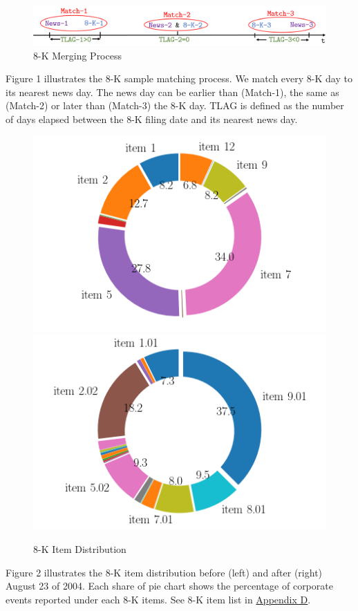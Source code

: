 \begin{figure}
	\caption{8-K Merging Process} \label{fig1}
	\begin{center}
		\includegraphics[scale=0.7]{../output/fig/fig1_matching.png}
	\end{center}
\end{figure}

Figure 1 illustrates the 8-K sample matching process. We match every 8-K day to its nearest news day. The news day can be earlier than (Match-1), the same as (Match-2) or later than (Match-3) the 8-K day. TLAG is defined as the number of days elapsed between the 8-K filing date and its nearest news day.

\begin{figure}[htbp]
	\begin{center}
		\caption{8-K Item Distribution} \label{fig2}
		\includegraphics[scale=0.5]{../output/fig/fig2_8-K_before.png}
		\includegraphics[scale=0.5]{../output/fig/fig2_8-K_after.png}
	\end{center}
\end{figure}

Figure 2 illustrates the 8-K item distribution before (left) and after (right) August 23 of 2004. Each share of pie chart shows the percentage of corporate events reported under each 8-K items. See 8-K item list in \hyperref[appd]{Appendix D}.